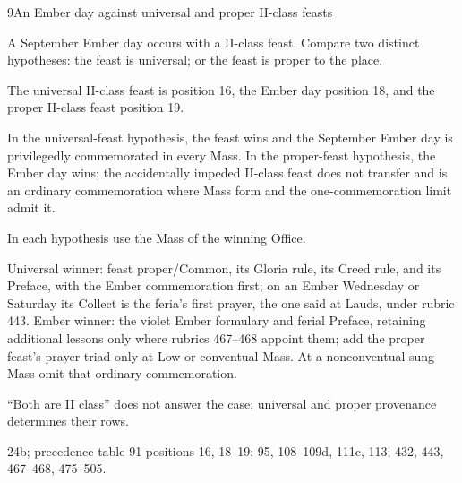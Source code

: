 \begin{casefile}{9}{An Ember day against universal and proper II-class feasts}
\item[Calendar facts] A September Ember day occurs with a II-class feast.  Compare two distinct hypotheses: the feast is universal; or the feast is proper to the place.
\item[Ranks and rows] The universal II-class feast is position 16, the Ember day position 18, and the proper II-class feast position 19.
\item[Impeded item] In the universal-feast hypothesis, the feast wins and the September Ember day is privilegedly commemorated in every Mass.  In the proper-feast hypothesis, the Ember day wins; the accidentally impeded II-class feast does not transfer and is an ordinary commemoration where Mass form and the one-commemoration limit admit it.
\item[Mass category] In each hypothesis use the Mass of the winning Office.
\item[Assembly] Universal winner: feast proper/Common, its Gloria rule, its Creed rule, and its Preface, with the Ember commemoration first; on an Ember Wednesday or Saturday its Collect is the feria's first prayer, the one said at Lauds, under rubric 443.  Ember winner: the violet Ember formulary and ferial Preface, retaining additional lessons only where rubrics 467--468 appoint them; add the proper feast's prayer triad only at Low or conventual Mass.  At a nonconventual sung Mass omit that ordinary commemoration.
\item[Boundary] “Both are II class” does not answer the case; universal and proper provenance determines their rows.
\item[Rubric locus] 24b; precedence table 91 positions 16, 18--19; 95, 108--109d, 111c, 113; 432, 443, 467--468, 475--505.
\end{casefile}

